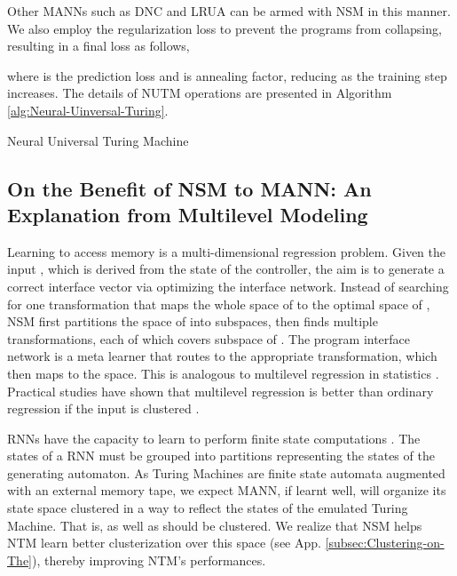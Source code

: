 \documentclass[english]{article}
\renewcommand{\cite}{\citep}
\begin{document}
Other MANNs such as DNC \cite{graves2016hybrid} and LRUA \cite{santoro2016meta}
can be armed with NSM in this manner. We also employ the regularization
loss  to prevent the programs from collapsing, resulting in
a final loss as follows,


where  is the prediction loss and  is annealing
factor, reducing as the training step increases. The details of NUTM
operations are presented in Algorithm \ref{alg:Neural-Uinversal-Turing}. 

\begin{algorithm}[t]
\begin{algorithmic}[1]
\For{}
\State{} 
\For{}
\EndFor
\State{}
\EndFor
\end{algorithmic} 

\caption{Neural Universal Turing Machine\label{alg:Neural-Uinversal-Turing}}
\end{algorithm}

\subsection{On the Benefit of NSM to MANN: An Explanation from Multilevel Modeling\label{subsec:On-the-Benefit}}

Learning to access memory is a multi-dimensional regression problem.
Given the input , which is derived from the state 
of the controller, the aim is to generate a correct interface vector
 via optimizing the interface network. Instead of searching
for one transformation that maps the whole space of  to the
optimal space of , NSM first partitions the space of 
into subspaces, then finds multiple transformations, each of which
covers subspace of . The program interface network 
is a meta learner that routes  to the appropriate transformation,
which then maps  to the  space. This is analogous
to multilevel regression in statistics \cite{andrew2006mr}. Practical
studies have shown that multilevel regression is better than ordinary
regression if the input is clustered \cite{cohen2014applied,huang2018multilevel}. 

RNNs have the capacity to learn to perform finite state computations
\cite{casey1996dynamics,tivno1998finite}. The states of a RNN must
be grouped into partitions representing the states of the generating
automaton. As Turing Machines are finite state automata augmented
with an external memory tape, we expect MANN, if learnt well, will
organize its state space clustered in a way to reflect the states
of the emulated Turing Machine. That is,  as well as 
should be clustered. We realize that NSM helps NTM learn better clusterization
over this space (see App. \ref{subsec:Clustering-on-The}), thereby
improving NTM's performances. 
 
\end{document}
